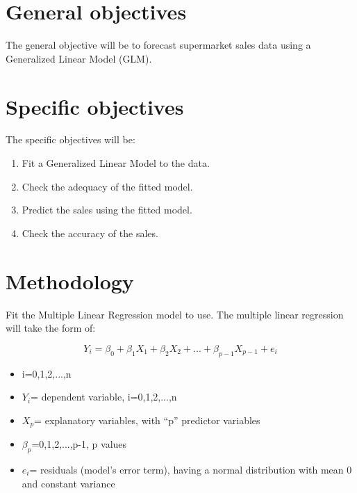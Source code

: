 \documentclass[twoside,a4paper,12pt]{article}
\begin{document}
\section*{General objectives}
The general objective will be to forecast supermarket sales data using a Generalized Linear  Model (GLM).
\section*{Specific objectives}The specific objectives will be:
\begin{enumerate}
	
\item Fit a Generalized Linear Model to the data.

\item Check the adequacy of the fitted model.	

\item Predict the sales using the fitted model.

\item Check the accuracy of the sales.

\end{enumerate}



\section*{Methodology} 
Fit the Multiple Linear Regression model to use. The multiple linear regression will take the form of:

\begin{equation}
	Y_i=\beta_0 + \beta_1X_1+\beta_2X_2+...+\beta_{p-1}X_{p-1}+e_i
\end{equation}	
\begin{itemize}
\item i=0,1,2,...,n
\item $Y_i$= dependent variable, i=0,1,2,...,n
\item $X_p$= explanatory variables, with “p” predictor variables 
\item $\beta_p$=0,1,2,...,p-1, p values
\end{itemize}
\begin{itemize}
\item $e_i$= residuals (model’s error term), having a normal distribution with mean 0 and constant variance
\end{itemize}
\end{document}
